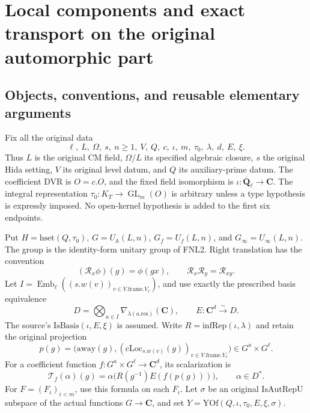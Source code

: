 \section{Local components and exact transport on the original automorphic part}
\label{sec:local-transport-v44}


\subsection{Objects, conventions, and reusable elementary arguments}

Fix all the original data
\[
 \ell,\ L,\ \Omega,\ s,\ n\ge1,\ V,\ Q,\ c,\ \iota,\ m,\ \tau_0,\
       \lambda,\ d,\ E,\ \xi.
\]
Thus \(L\) is the original CM field, \(\Omega/L\) its specified
algebraic closure, \(s\) the original Hida setting, \(V\) its original
level datum, and \(Q\) its auxiliary-prime datum.  The coefficient DVR
is \(O=c.O\), and the fixed field isomorphism is
\(\iota:\overline{\mathbf Q}_\ell\longrightarrow\mathbf C\).
The integral representation
\(\tau_0:K_T\longrightarrow\operatorname{GL}_m(O)\) is arbitrary
unless a type hypothesis is expressly imposed.  No open-kernel
hypothesis is added to the first six endpoints.

Put \(H=\mathrm{hset}(Q,\tau_0)\),
\(G=U_{\mathbb A}(L,n)\), \(G_f=U_f(L,n)\), and
\(G_\infty=U_\infty(L,n)\).  The group is the identity-form unitary
group of FNL2.  Right translation has the convention
\[
              (\mathscr R_x\phi)(g)=\phi(gx),
              \qquad \mathscr R_x\mathscr R_y=\mathscr R_{xy}.
\]
Let \(I=\operatorname{Emb}_\ell((s.w(v))_{v\in V.\mathrm{frame}.V_\ell})\),
and use exactly the prescribed basis equivalence
\[
 D=\bigotimes_{a\in I}\nabla_{\lambda(a.\mathrm{res})}(\mathbf C),
       \qquad E:\mathbf C^d\xrightarrow{\sim}D .
\]
The source's \(\mathrm{IsBasis}(\iota,E,\xi)\) is assumed.  Write
\(R=\mathrm{infRep}(\iota,\lambda)\) and retain the original projection
\[
 p(g)=\bigl(\mathrm{away}(g),
                 (\mathrm{cLoc}_{s.w(v)}(g))_{v\in V.\mathrm{frame}.V_\ell}\bigr)
             \in G^a\times G^\ell .
\]
For a coefficient function \(f:G^a\times G^\ell\to\mathbf C^d\),
its scalarization is
\begin{equation}\label{eq:ltp-scalarization}
       \mathcal T_f(\alpha)(g)
       =\alpha\bigl(R(g^{-1})E(f(p(g)))\bigr),
                   \qquad\alpha\in D^* .
\end{equation}
For \(F=(F_i)_{i<m}\), use this formula on each \(F_i\).
Let \(\sigma\) be an original \(\mathrm{IsAutRepU}\) subspace of
the actual functions \(G\to\mathbf C\), and set
\(Y=\mathrm{YOf}(Q,\iota,\tau_0,E,\xi,\sigma)\).


